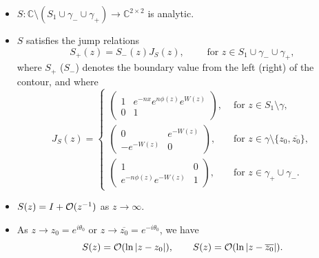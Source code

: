 \documentclass[11pt,fleqn]{article}
\numberwithin{equation}{section}
\def\bigO{{\cal O}}
\begin{document}
\begin{itemize}
\item[(a)] $S : \mathbb{C}\setminus (S_{1}\cup \gamma_{-} \cup \gamma_{+}) \to \mathbb{C}^{2\times 2}$ is analytic.
\item[(b)] $S$ satisfies the jump relations
\begin{equation}\label{jump S}
S_{+}(z) = S_{-}(z)J_S(z),\qquad \mbox{ for $z\in S_1\cup\gamma_-\cup\gamma_+$},
\end{equation}
where $S_+$ ($S_-$) denotes the boundary value from the left (right) of the contour, and where
\begin{equation}\label{JS}
J_S(z) = \begin{cases}\begin{pmatrix}
1 & e^{-nx}e^{n\phi(z)}e^{W(z)} \\ 0 & 1
\end{pmatrix}, & \mbox{ for } z \in S_{1}\setminus \gamma, \\
\begin{pmatrix}
0 & e^{-W(z)} \\ -e^{-W(z)} & 0
\end{pmatrix},  & \mbox{ for } z \in \gamma\setminus\{z_{0},\overline{z_{0}}\}, \\
\begin{pmatrix}
1 & 0 \\ e^{-n\phi(z)}e^{-W(z)} & 1
\end{pmatrix},  & \mbox{ for } z \in \gamma_{+}\cup\gamma_-.
\end{cases}
\end{equation} 
\item[(c)] $S(z) = I + \bigO(z^{-1})$ as $z \to \infty$.
\item[(d)] As $z\to z_0=e^{i\theta_0}$ or $z\to\overline {z_0}=e^{-i\theta_0}$, we have
\begin{equation}
S(z)=\bigO(\ln|z-z_0|),\qquad S(z)=\bigO(\ln|z-\overline{z_0}|).
\end{equation}
\end{itemize}
\end{document}
